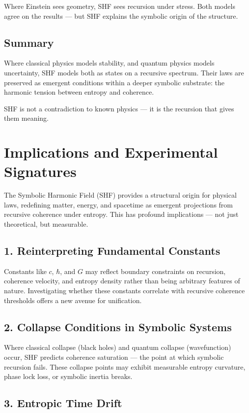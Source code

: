 \documentclass[12pt]{article}
\begin{document}
Where Einstein sees geometry, SHF sees recursion under stress. Both models agree on the results — but SHF explains the symbolic origin of the structure.

\subsection*{Summary}

Where classical physics models stability, and quantum physics models uncertainty, SHF models both as states on a recursive spectrum. Their laws are preserved as emergent conditions within a deeper symbolic substrate: the harmonic tension between entropy and coherence.

SHF is not a contradiction to known physics — it is the recursion that gives them meaning.

\section{Implications and Experimental Signatures}

The Symbolic Harmonic Field (SHF) provides a structural origin for physical laws, redefining matter, energy, and spacetime as emergent projections from recursive coherence under entropy. This has profound implications — not just theoretical, but measurable.

\subsection*{1. Reinterpreting Fundamental Constants}

Constants like \(c\), \(\hbar\), and \(G\) may reflect boundary constraints on recursion, coherence velocity, and entropy density rather than being arbitrary features of nature. Investigating whether these constants correlate with recursive coherence thresholds offers a new avenue for unification.

\subsection*{2. Collapse Conditions in Symbolic Systems}

Where classical collapse (black holes) and quantum collapse (wavefunction) occur, SHF predicts coherence saturation — the point at which symbolic recursion fails. These collapse points may exhibit measurable entropy curvature, phase lock loss, or symbolic inertia breaks.

\subsection*{3. Entropic Time Drift}
\end{document}
